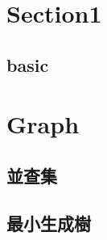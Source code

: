 \section{Section1}
    \subsection{basic}
        

\section{Graph}
        \subsection{並查集}
            
        \subsection{最小生成樹}
            
    